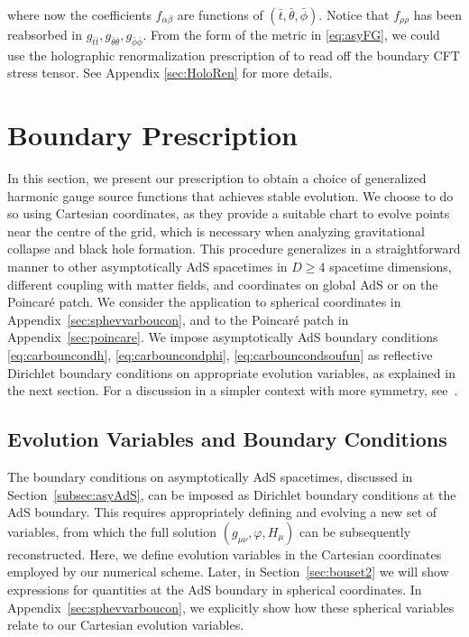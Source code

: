 \documentclass[a4paper,11pt]{article}
\numberwithin{equation}{section}
\begin{document}
where now the coefficients $f_{\alpha\beta}$ are functions of $(\bar t, \bar\theta, \bar\phi)$. 
Notice that $f_{\rho\rho}$ has been reabsorbed in $g_{\bar{t}\bar{t}}, g_{\bar{\theta}\bar{\theta}}, g_{\bar{\phi}\bar{\phi}}$. From the form of the metric in \eqref{eq:asyFG}, we could use the holographic renormalization prescription of \cite{deHaro:2000vlm} to read off the boundary CFT stress tensor. See Appendix \ref{sec:HoloRen} for more details.



\section{Boundary Prescription}\label{sec:pre_sta}

In this section, we present our prescription to obtain a choice of generalized harmonic gauge source functions that achieves stable evolution.
We choose to do so using Cartesian coordinates, as they provide a suitable chart to evolve points near the centre of the grid, which is necessary when analyzing gravitational collapse and black hole formation. 
This procedure generalizes in a straightforward manner to other asymptotically AdS spacetimes in $D\geq 4$ spacetime dimensions, different coupling with matter fields, and coordinates on global AdS or on the Poincar\'{e} patch. We consider the application to spherical coordinates in Appendix~\ref{sec:sphevvarboucon}, and to the Poincar\'e patch in Appendix~\ref{sec:poincare}.
We impose asymptotically AdS boundary conditions \eqref{eq:carbouncondh}, \eqref{eq:carbouncondphi}, \eqref{eq:carbouncondsoufun} as reflective Dirichlet boundary conditions on appropriate evolution variables, as explained in the next section.
For a discussion in a simpler context with more symmetry, see~\cite{Bantilan:2012vu}.

\subsection{Evolution Variables and Boundary Conditions}\label{subsec:cartevvarboucon}

The boundary conditions on asymptotically AdS spacetimes, discussed in Section~\ref{subsec:asyAdS}, can be imposed as Dirichlet boundary conditions at the AdS boundary.
This requires appropriately defining and evolving a new set of variables, from which the full solution $(g_{\mu\nu},\varphi,H_\mu)$ can be subsequently reconstructed. 
Here, we define evolution variables in the Cartesian coordinates employed by our numerical scheme.
Later, in Section~\ref{sec:bouset2} we will show expressions for quantities at the AdS boundary in spherical coordinates.
In Appendix~\ref{sec:sphevvarboucon}, we explicitly show how these spherical variables relate to our Cartesian evolution variables.
\end{document}
